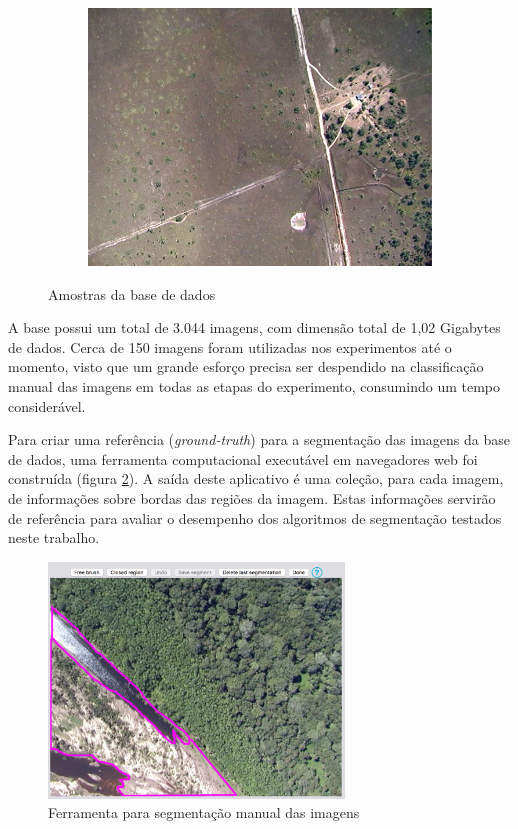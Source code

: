 \begin{figure}[h]
\begin{subfigure}[b]{0.3\textwidth}
    \includegraphics[width=\textwidth]{imgs/amostra3}
  \end{subfigure}%
  \caption{Amostras da base de dados}
  \label{fig:amostra}
\end{figure}

A base possui um total de 3.044 imagens, com dimensão total de 1,02 Gigabytes de dados. Cerca de 150 imagens foram utilizadas nos experimentos até o momento, visto que um grande esforço precisa ser despendido na classificação manual das imagens em todas as etapas do experimento, consumindo um tempo considerável.

Para criar uma referência (\textit{ground-truth}) para a segmentação das imagens da base de dados, uma ferramenta computacional executável em navegadores web foi construída (figura \ref{fig:manualseg}). A saída deste aplicativo é uma coleção, para cada imagem, de informações sobre bordas das regiões da imagem. Estas informações servirão de referência para avaliar o desempenho dos algoritmos de segmentação testados neste trabalho.

\begin{figure}[h]
  \centering
  \includegraphics[width=0.7\textwidth]{imgs/manualseg}
  \caption{Ferramenta para segmentação manual das imagens}
  \label{fig:manualseg}
\end{figure}

